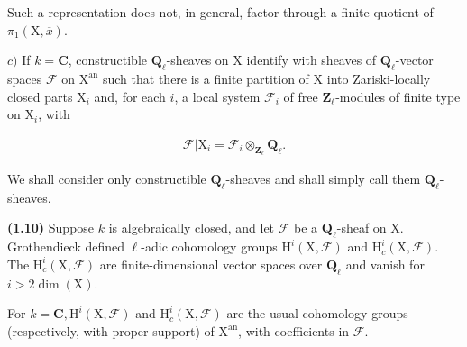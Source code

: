 \documentclass[10pt,leqno]{article}
\begin{document}
\noindent Such a representation does not, in general, factor through a finite quotient of \(\pi _{1}(\mathrm{X},\overline{x})\).\par

\noindent \(c)\) If \(k=\mathbf{C}\), constructible \(\mathbf{Q}_{\ell }\)-sheaves on \(\mathrm{X}\) identify with sheaves of \(\mathbf{Q}_{\ell }\)-vector spaces \(\mathcal{F} \) on \(\mathrm{X}^{\mathrm{an}}\) such that there is a finite partition of \(\mathrm{X}\) into Zariski-locally closed parts \(\mathrm{X}_{i}\) and, for each \(i\), a local system \(\mathcal{F} _{i}\) of free \(\mathbf{Z}_{\ell }\)-modules of finite type on \(\mathrm{X}_{i}\), with\par

\begin{equation*}\begin{gathered}\mathcal{F} |\mathrm{X}_{i} = \mathcal{F} _{i} \otimes _{\mathbf{Z}_{\ell }} \mathbf{Q}_{\ell }.\end{gathered}\end{equation*}

\noindent We shall consider only constructible \(\mathbf{Q}_{\ell }\)-sheaves and shall simply call them \(\mathbf{Q}_{\ell }\)-sheaves.\par

\noindent \textbf{(1.10)} Suppose \(k\) is algebraically closed, and let \(\mathcal{F} \) be a \(\mathbf{Q}_{\ell }\)-sheaf on \(\mathrm{X}\). Grothendieck defined \(\ell \)-adic cohomology groups \(\mathrm{H}^{i}(\mathrm{X},\mathcal{F} )\) and \(\mathrm{H}_{c}^{i}(\mathrm{X},\mathcal{F} )\). The \(\mathrm{H}_{c}^{i}(\mathrm{X},\mathcal{F} )\) are finite-dimensional vector spaces over \(\mathbf{Q}_{\ell }\) and vanish for \(i>2 \operatorname{dim}(\mathrm{X})\).\par

\clearpage

\label{physical-7}\par\smallskip

\noindent For \(k=\mathbf{C}, \mathrm{H}^{i}(\mathrm{X},\mathcal{F} )\) and \(\mathrm{H}_{c}^{i}(\mathrm{X},\mathcal{F} )\) are the usual cohomology groups (respectively, with proper support) of \(\mathrm{X}^{\mathrm{an}}\), with coefficients in \(\mathcal{F} \).\par
\end{document}
